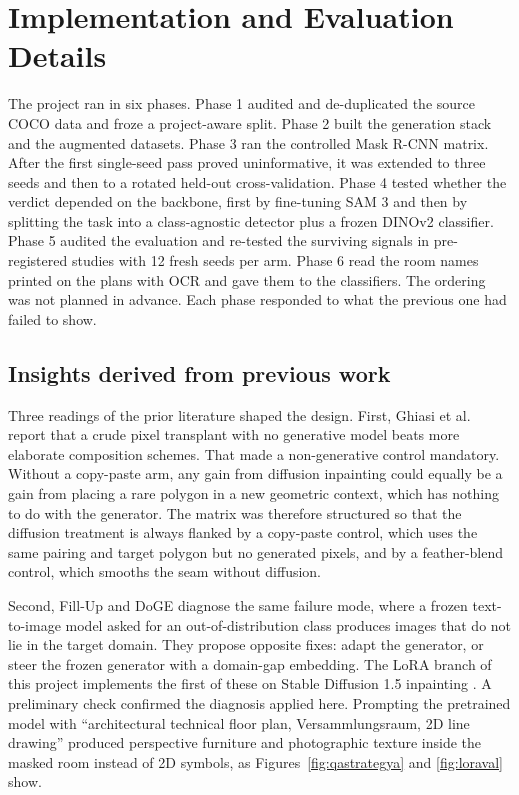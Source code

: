 \section{Implementation and Evaluation Details}

The project ran in six phases. Phase 1 audited and de-duplicated the source
COCO data and froze a project-aware split. Phase 2 built the generation stack
and the augmented datasets. Phase 3 ran the controlled Mask R-CNN matrix. After
the first single-seed pass proved uninformative, it was extended to three seeds
and then to a rotated held-out cross-validation. Phase 4 tested whether the
verdict depended on the backbone, first by fine-tuning SAM 3 and then by
splitting the task into a class-agnostic detector plus a frozen DINOv2
classifier. Phase 5 audited the evaluation and re-tested the surviving signals
in pre-registered studies with 12 fresh seeds per arm. Phase 6 read the room
names printed on the plans with OCR and gave them to the classifiers. The
ordering was not planned in advance. Each phase responded to what the previous
one had failed to show.

\subsection{Insights derived from previous work}

Three readings of the prior literature shaped the design. First, Ghiasi et al.\
\cite{ghiasi2021copypaste} report that a crude pixel transplant with no
generative model beats more elaborate composition schemes. That made a
non-generative control mandatory. Without a copy-paste arm, any gain from
diffusion inpainting could equally be a gain from placing a rare polygon in a
new geometric context, which has nothing to do with the generator. The matrix
was therefore structured so that the diffusion treatment is always flanked by a
copy-paste control, which uses the same pairing and target polygon but no
generated pixels, and by a feather-blend control, which smooths the seam without
diffusion.

Second, Fill-Up \cite{shin2023fillup} and DoGE \cite{wang2024doge} diagnose the
same failure mode, where a frozen text-to-image model asked for an
out-of-distribution class produces images that do not lie in the target domain.
They propose opposite fixes: adapt the generator, or steer the frozen generator
with a domain-gap embedding. The LoRA branch of this project implements the
first of these on Stable Diffusion 1.5 inpainting
\cite{rombach2022ldm,hu2022lora}. A preliminary check confirmed the diagnosis
applied here. Prompting the pretrained model with ``architectural technical
floor plan, Versammlungsraum, 2D line drawing'' produced perspective furniture
and photographic texture inside the masked room instead of 2D symbols, as
Figures~\ref{fig:qastrategya} and \ref{fig:loraval} show.

